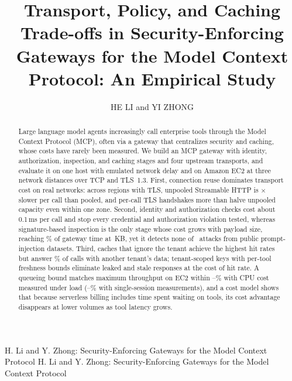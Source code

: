 \documentclass{ieeeaccess}
\newcommand{\ms}{\,ms\xspace}
\begin{document}

\title{Transport, Policy, and Caching Trade-offs in Security-Enforcing Gateways for the Model Context Protocol: An Empirical Study}

\author{\uppercase{He Li} and \uppercase{Yi Zhong}}

\address[1]{Independent Researcher, Kirkland, WA, USA (e-mail: heli268@outlook.com)}
\address[2]{Independent Researcher, Kirkland, WA, USA (e-mail: peterzhongyi@outlook.com)}
\address[*]{These authors contributed equally to this work.}

\markboth
{H. Li and Y. Zhong: Security-Enforcing Gateways for the Model Context Protocol}
{H. Li and Y. Zhong: Security-Enforcing Gateways for the Model Context Protocol}


\begin{abstract}
Large language model agents increasingly call enterprise tools through the Model Context Protocol (MCP), often via a gateway that centralizes security and caching, whose costs have rarely been measured. We build an MCP gateway with identity, authorization, inspection, and caching stages and four upstream transports, and evaluate it on one host with emulated network delay and on Amazon EC2 at three network distances over TCP and TLS~1.3. First, connection reuse dominates transport cost on real networks: across regions with TLS, unpooled Streamable HTTP is \awTthreeOverTfourXregTls$\times$ slower per call than pooled, and per-call TLS handshakes more than halve unpooled capacity even within one zone. Second, identity and authorization checks cost about 0.1\ms per call and stop every credential and authorization violation tested, whereas signature-based inspection is the only stage whose cost grows with payload size, reaching \mDpiShareBig\% of gateway time at \mBigSize\,KB, yet it detects none of \extAttacks\ attacks from public prompt-injection datasets. Third, caches that ignore the tenant achieve the highest hit rates but answer \cGlruLeak\% of calls with another tenant's data; tenant-scoped keys with per-tool freshness bounds eliminate leaked and stale responses at the cost of hit rate. A queueing bound matches maximum throughput on EC2 within \awMapeMin--\awMapeMax\% with CPU cost measured under load (\awMapeOneMin--\awMapeOneMax\% with single-session measurements), and a cost model shows that because serverless billing includes time spent waiting on tools, its cost advantage disappears at lower volumes as tool latency grows.
\end{abstract}
\end{document}
